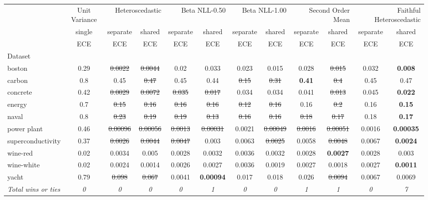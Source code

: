 \begin{tabular}{l|c|cc|cc|cc|cc|cc}
\toprule
{} & {Unit Variance} & \multicolumn{2}{r}{Heteroscedastic} & \multicolumn{2}{r}{Beta NLL-0.50} & \multicolumn{2}{r}{Beta NLL-1.00} & \multicolumn{2}{r}{Second Order Mean} & \multicolumn{2}{r}{Faithful Heteroscedastic} \\
{} & {single} & {separate} & {shared} & {separate} & {shared} & {separate} & {shared} & {separate} & {shared} & {separate} & {shared} \\
{} & {ECE} & {ECE} & {ECE} & {ECE} & {ECE} & {ECE} & {ECE} & {ECE} & {ECE} & {ECE} & {ECE} \\
{Dataset} & {} & {} & {} & {} & {} & {} & {} & {} & {} & {} & {} \\
\midrule
boston & 0.29 & \sout{0.0022} & \sout{0.0044} & 0.02 & 0.033 & 0.023 & 0.015 & 0.028 & \sout{0.015} & 0.032 & \textbf{0.008} \\
carbon & 0.8 & 0.45 & \sout{0.47} & 0.45 & 0.44 & \sout{0.15} & \sout{0.31} & \textbf{0.41} & \sout{0.4} & 0.45 & 0.47 \\
concrete & 0.42 & \sout{0.0029} & \sout{0.0072} & \sout{0.035} & \sout{0.017} & 0.034 & 0.034 & 0.041 & \sout{0.013} & 0.045 & \textbf{0.022} \\
energy & 0.7 & \sout{0.15} & \sout{0.16} & \sout{0.16} & \sout{0.16} & \sout{0.12} & \sout{0.16} & 0.16 & \sout{0.2} & 0.16 & \textbf{0.15} \\
naval & 0.8 & \sout{0.23} & \sout{0.19} & \sout{0.19} & \sout{0.13} & \sout{0.16} & \sout{0.16} & \sout{0.18} & \sout{0.17} & 0.18 & \textbf{0.17} \\
power plant & 0.46 & \sout{0.00096} & \sout{0.00056} & \sout{0.0013} & \sout{0.00031} & 0.0021 & \sout{0.00049} & \sout{0.0016} & \sout{0.00051} & 0.0016 & \textbf{0.00035} \\
superconductivity & 0.37 & \sout{0.0026} & \sout{0.0044} & \sout{0.0047} & 0.003 & 0.0063 & \sout{0.0025} & 0.0058 & \sout{0.0048} & 0.0067 & \textbf{0.0024} \\
wine-red & 0.02 & 0.0034 & 0.005 & 0.0028 & 0.0032 & 0.0036 & 0.0032 & 0.0028 & \textbf{0.0027} & 0.0028 & 0.003 \\
wine-white & 0.02 & 0.0024 & 0.0014 & 0.0026 & 0.0027 & 0.0036 & 0.0019 & 0.0027 & 0.0018 & 0.0027 & \textbf{0.0011} \\
yacht & 0.79 & \sout{0.098} & \sout{0.067} & 0.0041 & \textbf{0.00094} & 0.017 & 0.018 & 0.026 & \sout{0.0094} & 0.0067 & 0.0069 \\
\textit{{Total wins or ties}} & \textit{0} & \textit{0} & \textit{0} & \textit{0} & \textit{1} & \textit{0} & \textit{0} & \textit{1} & \textit{1} & \textit{0} & \textit{7} \\
\bottomrule
\end{tabular}
